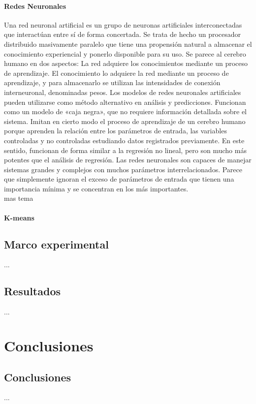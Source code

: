 \documentclass[spanish,11pt,letterpaper,oneside]{memoir}
\begin{document}
\subsection{Redes Neuronales}
	Una red neuronal artificial es un grupo de neuronas artificiales interconectadas que interactúan entre sí de forma concertada. Se trata de hecho un procesador distribuido masivamente paralelo que tiene una propensión natural a almacenar el conocimiento experiencial y ponerlo disponible para su uso. Se parece al cerebro humano en dos aspectos: La red adquiere los conocimientos mediante un proceso de aprendizaje.	
	El conocimiento lo adquiere la red mediante un proceso de aprendizaje, y para almacenarlo se utilizan las intensidades de conexión interneuronal, denominadas pesos. Los modelos de redes neuronales artificiales pueden utilizarse como método alternativo en análisis y predicciones. Funcionan como un modelo de «caja negra», que no requiere información detallada sobre el sistema. Imitan en cierto modo el proceso de aprendizaje de un cerebro humano porque aprenden la relación entre los parámetros de entrada, las variables controladas y no controladas estudiando datos registrados previamente. En este sentido, funcionan de forma similar a la regresión no lineal, pero son mucho más potentes que el análisis de regresión. Las redes neuronales son capaces de manejar sistemas grandes y complejos con muchos parámetros interrelacionados. Parece que simplemente ignoran el exceso de parámetros de entrada que tienen una importancia mínima y se concentran en los más importantes. \\
	 mas tema
	

\subsection{K-means}
\chapter{Marco experimental}

...

\chapter{Resultados}

...

\part{Conclusiones}
\chapter{Conclusiones}

...


 
\end{document}
